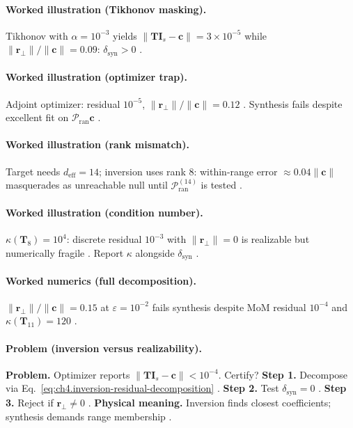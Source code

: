 \paragraph{Worked illustration (Tikhonov masking).}
Tikhonov with \(\alpha=10^{-3}\) yields \(\|\mathbf{T}\mathbf{I}_{s}-\mathbf{c}\|=3\times10^{-5}\) while \(\|\mathbf{r}_{\perp}\|/\|\mathbf{c}\|=0.09\):
\(\delta_{\mathrm{syn}}>0\) \cite{harrington2001,devaney2004,stratton1941}.

\paragraph{Worked illustration (optimizer trap).}
Adjoint optimizer: residual \(10^{-5}\), \(\|\mathbf{r}_{\perp}\|/\|\mathbf{c}\|=0.12\) \cite{harrington2001,devaney2004}. Synthesis fails despite
excellent fit on \(\mathcal{P}_{\mathrm{ran}}\mathbf{c}\) \cite{stratton1941,hansen1988}.

\paragraph{Worked illustration (rank mismatch).}
Target needs \(d_{\mathrm{eff}}=14\); inversion uses rank \(8\): within-range error \(\approx0.04\|\mathbf{c}\|\) masquerades as unreachable null
until \(\mathcal{P}_{\mathrm{ran}}^{(14)}\) is tested \cite{hansen1988,harrington2001,devaney2004}.

\paragraph{Worked illustration (condition number).}
\(\kappa(\mathbf{T}_{8})=10^{4}\): discrete residual \(10^{-3}\) with \(\|\mathbf{r}_{\perp}\|=0\) is realizable but numerically fragile
\cite{hansen1988,harrington2001}. Report \(\kappa\) alongside \(\delta_{\mathrm{syn}}\) \cite{stratton1941}.

\paragraph{Worked numerics (full decomposition).}
\(\|\mathbf{r}_{\perp}\|/\|\mathbf{c}\|=0.15\) at \(\varepsilon=10^{-2}\) fails synthesis despite MoM residual \(10^{-4}\) and
\(\kappa(\mathbf{T}_{11})=120\) \cite{harrington2001,hansen1988,devaney2004}.

\paragraph{Problem (inversion versus realizability).}
\textbf{Problem.} Optimizer reports \(\|\mathbf{T}\mathbf{I}_{s}-\mathbf{c}\|<10^{-4}\). Certify?
\textbf{Step 1.} Decompose via Eq.~\eqref{eq:ch4.inversion-residual-decomposition} \cite{stratton1941}.
\textbf{Step 2.} Test \(\delta_{\mathrm{syn}}=0\) \cite{harrington2001,devaney2004}.
\textbf{Step 3.} Reject if \(\mathbf{r}_{\perp}\neq0\) \cite{hansen1988}.
\textbf{Physical meaning.} Inversion finds closest coefficients; synthesis demands range membership \cite{stratton1941}.

